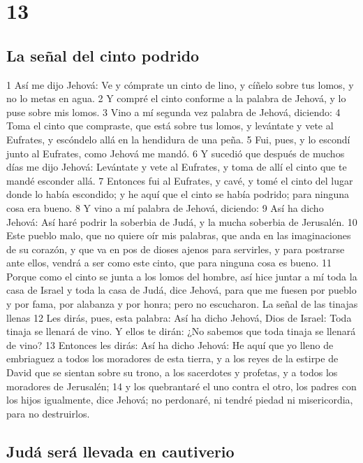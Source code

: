 \chapter{13}

\section*{La señal del cinto podrido}

1 Así me dijo Jehová: Ve y cómprate un cinto de lino, y cíñelo sobre tus lomos, y no lo metas en agua.
2 Y compré el cinto conforme a la palabra de Jehová, y lo puse sobre mis lomos.
3 Vino a mí segunda vez palabra de Jehová, diciendo:
4 Toma el cinto que compraste, que está sobre tus lomos, y levántate y vete al Eufrates, y escóndelo allá en la hendidura de una peña.
5 Fui, pues, y lo escondí junto al Eufrates, como Jehová me mandó.
6 Y sucedió que después de muchos días me dijo Jehová: Levántate y vete al Eufrates, y toma de allí el cinto que te mandé esconder allá.
7 Entonces fui al Eufrates, y cavé, y tomé el cinto del lugar donde lo había escondido; y he aquí que el cinto se había podrido; para ninguna cosa era bueno.
8 Y vino a mí palabra de Jehová, diciendo:
9 Así ha dicho Jehová: Así haré podrir la soberbia de Judá, y la mucha soberbia de Jerusalén. 
10 Este pueblo malo, que no quiere oír mis palabras, que anda en las imaginaciones de su corazón, y que va en pos de dioses ajenos para servirles, y para postrarse ante ellos, vendrá a ser como este cinto, que para ninguna cosa es bueno.
11 Porque como el cinto se junta a los lomos del hombre, así hice juntar a mí toda la casa de Israel y toda la casa de Judá, dice Jehová, para que me fuesen por pueblo y por fama, por alabanza y por honra; pero no escucharon.
La señal de las tinajas llenas
12 Les dirás, pues, esta palabra: Así ha dicho Jehová, Dios de Israel: Toda tinaja se llenará de vino. Y ellos te dirán: ¿No sabemos que toda tinaja se llenará de vino?
13 Entonces les dirás: Así ha dicho Jehová: He aquí que yo lleno de embriaguez a todos los moradores de esta tierra, y a los reyes de la estirpe de David que se sientan sobre su trono, a los sacerdotes y profetas, y a todos los moradores de Jerusalén;
14 y los quebrantaré el uno contra el otro, los padres con los hijos igualmente, dice Jehová; no perdonaré, ni tendré piedad ni misericordia, para no destruirlos.

\section*{Judá será llevada en cautiverio}

